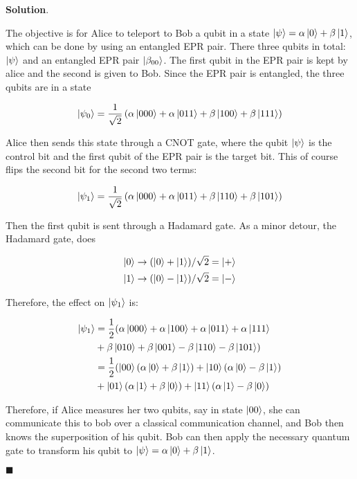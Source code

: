 \documentclass[12pt]{article}
\theoremstyle{definition}
\newenvironment{s}{%
        \begin{trivlist} \item \textbf{Solution}. }{%
            \hspace*{\fill} $\blacksquare$\end{trivlist}}%
\begin{document}
{\begin{s}

The objective is for Alice to teleport to Bob a qubit in a state $\ket{\psi} = \alpha\ket{0} + \beta\ket{1}$, which can be done by using an entangled EPR pair. There three qubits in total: $\ket{\psi}$ and an entangled EPR pair $\ket{\beta_{00}}$. The first qubit in the EPR pair is kept by alice and the second is given to Bob. Since the EPR pair is entangled, the three qubits are in a state

\begin{equation*}
\ket{\psi_{0}} = \frac{1}{\sqrt{2}}\left(\alpha\ket{000} + \alpha\ket{011} + \beta\ket{100} + \beta\ket{111}\right)
\end{equation*}

Alice then sends this state through a CNOT gate, where the qubit $\ket{\psi}$ is the control bit and the first qubit of the EPR pair is the target bit. This of course flips the second bit for the second two terms:

\begin{equation*}
\ket{\psi_{1}} = \frac{1}{\sqrt{2}}\left(\alpha\ket{000} + \alpha\ket{011} + \beta\ket{110} + \beta\ket{101}\right)
\end{equation*}

Then the first qubit is sent through a Hadamard gate. As a minor detour, the Hadamard gate, does

\begin{align*}
\ket{0} &\rightarrow (\ket{0} + \ket{1})/\sqrt{2} = \ket{+}\\
\ket{1} &\rightarrow (\ket{0} - \ket{1})/\sqrt{2} = \ket{-}
\end{align*}

Therefore, the effect on $\ket{\psi_1}$ is:


\begin{align*}
\ket{\psi_{1}} &= \frac{1}{2}(\alpha\ket{000} + \alpha\ket{100} + \alpha\ket{011} + \alpha\ket{111}\\
&+ \beta\ket{010} + \beta\ket{001} - \beta\ket{110} - \beta\ket{101})\\
&= \frac{1}{2}(\ket{00}(\alpha\ket{0} + \beta\ket{1}) + \ket{10}(\alpha\ket{0} - \beta\ket{1})\\
&+ \ket{01}(\alpha\ket{1} + \beta\ket{0}) + \ket{11}(\alpha\ket{1} - \beta\ket{0})
\end{align*}

Therefore, if Alice measures her two qubits, say in state $\ket{00}$, she can communicate this to bob over a classical communication channel, and Bob then knows the superposition of his qubit. Bob can then apply the necessary quantum gate to transform his qubit to $\ket{\psi} = \alpha\ket{0} + \beta\ket{1}$.


\end{s}}
\end{document}
